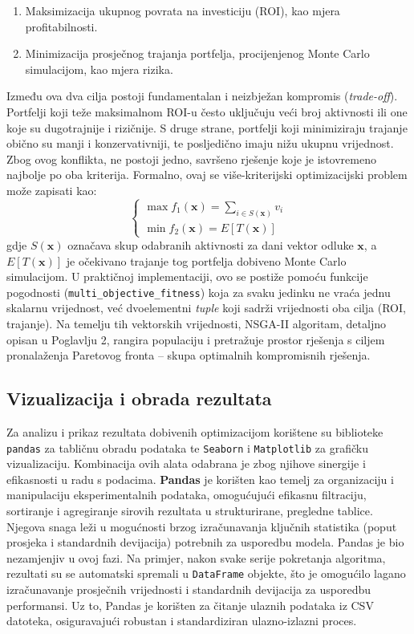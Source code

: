 \begin{enumerate}
\begin{enumerate}
    \item Maksimizacija ukupnog povrata na investiciju (ROI), kao mjera profitabilnosti.
    \item Minimizacija prosječnog trajanja portfelja, procijenjenog Monte Carlo simulacijom, kao mjera rizika.
\end{enumerate}

Između ova dva cilja postoji fundamentalan i neizbježan kompromis (\textit{trade-off}). Portfelji koji teže maksimalnom ROI-u često uključuju veći broj aktivnosti ili one koje su dugotrajnije i rizičnije. S druge strane, portfelji koji minimiziraju trajanje obično su manji i konzervativniji, te posljedično imaju nižu ukupnu vrijednost. Zbog ovog konflikta, ne postoji jedno, savršeno rješenje koje je istovremeno najbolje po oba kriterija.
Formalno, ovaj se više-kriterijski optimizacijski problem može zapisati kao:
$$
\begin{cases} 
\max f_1(\mathbf{x}) = \sum_{i \in S(\mathbf{x})} v_i \\ 
\min f_2(\mathbf{x}) = E[T(\mathbf{x})]
\end{cases}
$$
gdje $S(\mathbf{x})$ označava skup odabranih aktivnosti za dani vektor odluke $\mathbf{x}$, a $E[T(\mathbf{x})]$ je očekivano trajanje tog portfelja dobiveno Monte Carlo simulacijom.
U praktičnoj implementaciji, ovo se postiže pomoću funkcije pogodnosti (\texttt{multi\_objective\_fitness}) koja za svaku jedinku ne vraća jednu skalarnu vrijednost, već dvoelementni \textit{tuple} koji sadrži vrijednosti oba cilja (ROI, trajanje). Na temelju tih vektorskih vrijednosti, NSGA-II algoritam, detaljno opisan u Poglavlju 2, rangira populaciju i pretražuje prostor rješenja s ciljem pronalaženja Paretovog fronta – skupa optimalnih kompromisnih rješenja.
\end{enumerate}
\subsection{Vizualizacija i obrada rezultata}

Za analizu i prikaz rezultata dobivenih optimizacijom korištene su biblioteke \texttt{pandas} za tabličnu obradu podataka te \texttt{Seaborn} i \texttt{Matplotlib} \cite{Waskom2021, Hunter2007} za grafičku vizualizaciju. Kombinacija ovih alata odabrana je zbog njihove sinergije i efikasnosti u radu s podacima.
\textbf{Pandas} je korišten kao temelj za organizaciju i manipulaciju eksperimentalnih podataka, omogućujući efikasnu filtraciju, sortiranje i agregiranje sirovih rezultata u strukturirane, pregledne tablice. Njegova snaga leži u mogućnosti brzog izračunavanja ključnih statistika (poput prosjeka i standardnih devijacija) potrebnih za usporedbu modela. Pandas je bio nezamjenjiv u ovoj fazi. Na primjer, nakon svake serije pokretanja algoritma, rezultati su se automatski spremali u \texttt{DataFrame} objekte, što je omogućilo lagano izračunavanje prosječnih vrijednosti i standardnih devijacija za usporedbu performansi. Uz to, Pandas je korišten za čitanje ulaznih podataka iz CSV datoteka, osiguravajući robustan i standardiziran ulazno-izlazni proces.

